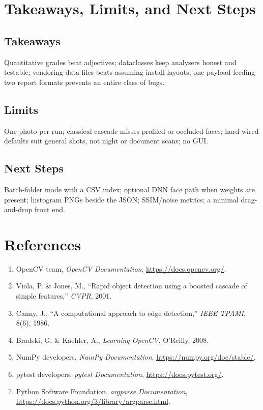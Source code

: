 \documentclass[11pt,a4paper]{article}
\begin{document}
\section{Takeaways, Limits, and Next Steps}
\subsection{Takeaways}
Quantitative grades beat adjectives; dataclasses keep analysers honest and
testable; vendoring data files beats assuming install layouts; one payload
feeding two report formats prevents an entire class of bugs.

\subsection{Limits}
One photo per run; classical cascade misses profiled or occluded faces;
hard-wired defaults suit general shots, not night or document scans; no GUI.

\subsection{Next Steps}
Batch-folder mode with a CSV index; optional DNN face path when weights are
present; histogram PNGs beside the JSON; SSIM/noise metrics; a minimal
drag-and-drop front end.

\section{References}
\begin{enumerate}[leftmargin=1.5em]
  \item OpenCV team, \textit{OpenCV Documentation}, \url{https://docs.opencv.org/}.
  \item Viola, P. \& Jones, M., ``Rapid object detection using a boosted cascade
    of simple features,'' \emph{CVPR}, 2001.
  \item Canny, J., ``A computational approach to edge detection,''
    \emph{IEEE TPAMI}, 8(6), 1986.
  \item Bradski, G. \& Kaehler, A., \textit{Learning OpenCV}, O'Reilly, 2008.
  \item NumPy developers, \textit{NumPy Documentation}, \url{https://numpy.org/doc/stable/}.
  \item pytest developers, \textit{pytest Documentation}, \url{https://docs.pytest.org/}.
  \item Python Software Foundation, \textit{argparse Documentation},
    \url{https://docs.python.org/3/library/argparse.html}.
\end{enumerate}
\end{document}
